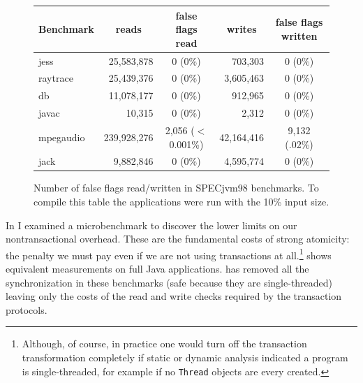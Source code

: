 \begin{figure}\small %
\begin{tabular}{|l||r|c||r|c|}
Benchmark &\multicolumn{1}{c|}{reads}& false flags read &\multicolumn{1}{c|}{writes}& false flags written
\\ \hline
jess &      25,583,878 & 0  (0\%)&  703,303  &  0  (0\%) \\
raytrace &  25,439,376 & 0  (0\%)&3,605,463  &  0  (0\%) \\
db &        11,078,177 & 0  (0\%)&  912,965  &  0  (0\%) \\
javac &         10,315 & 0  (0\%)&    2,312  &  0  (0\%) \\
mpegaudio& 239,928,276 & 2,056  ($<$0.001\%)&  42,164,416  &  9,132 (.02\%) \\
jack &       9,882,846 & 0  (0\%)& 4,595,774 &  0 (0\%) \\ \hline
\end{tabular}
\caption[Number of false flags read/written in SPECjvm98 benchmarks.]
{Number of false flags read/written in SPECjvm98 benchmarks.  To
  compile this table the
  applications were run with the 10\% input size.}
\label{fig:false-flag}
\end{figure}


In  I examined a microbenchmark to discover the
lower limits on our nontransactional overhead.  These are the
fundamental costs of strong atomicity: the penalty we must pay even if
we are not using transactions at all.\footnote{Although, of course, in
  practice one would turn off the transaction transformation
  completely if static or dynamic analysis indicated a program is
  single-threaded, for example if no \texttt{Thread} objects are every
  created.}   shows equivalent measurements on
full Java applications.  \Flex has removed all the synchronization in
these benchmarks (safe because they are single-threaded) leaving only
the costs of the read and write checks required by the transaction
protocols.


